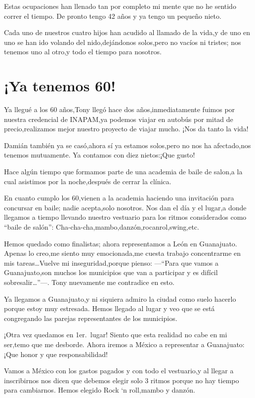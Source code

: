 \documentclass[letterpaper,12pt]{book}
\begin{document}
Estas ocupaciones han llenado tan por completo mi mente que no he sentido correr el tiempo. De pronto tengo 42 años y ya tengo un pequeño nieto.

Cada uno de nuestros cuatro hijos han acudido al llamado de la vida,y de uno en uno se han ido volando del nido,dejándonos solos,pero no vacíos ni tristes; nos tenemos uno al otro,y todo el tiempo para nosotros.

\chapter{¡Ya tenemos 60!}
Ya llegué a los 60 años,Tony llegó hace dos años,inmediatamente fuimos por nuestra credencial de INAPAM,ya podemos viajar en autobús por mitad de precio,realizamos mejor nuestro proyecto de viajar mucho. ¡Nos da tanto la vida!

Damián también ya se casó,ahora sí ya estamos solos,pero no nos ha afectado,nos tenemos mutuamente. Ya contamos con diez nietos:¡Que gusto!  

Hace algún tiempo que formamos parte de una academia de baile de salon,a la cual asistimos por la noche,después de cerrar la clínica.

En cuanto cumplo los 60,vienen a la academia haciendo una invitación para concursar en baile; nadie acepta,solo nosotros. Nos dan el día y el lugar,a donde llegamos a tiempo llevando nuestro vestuario para los ritmos considerados como ``baile de salón'': Cha-cha-cha,mambo,danzón,rocanrol,swing,etc.

Hemos quedado como finalistas; ahora representamos a León en Guanajuato.  Apenas lo creo,me siento muy emocionada,me cuesta trabajo concentrarme en mis tareas\ldots Vuelve mi inseguridad,porque pienso: ---``Para que vamos a Guanajuato,son muchos los municipios que van a participar y es difícil sobresalir\ldots''---. Tony nuevamente me contradice en esto. 

Ya llegamos a Guanajuato,y ni siquiera admiro la ciudad como suelo hacerlo porque estoy muy estresada. Hemos llegado al lugar y veo que se está congregando las parejas representantes de los municipios.

¡Otra vez quedamos en 1er.\ lugar! Siento que esta realidad no cabe en mi ser,temo que me desborde. Ahora iremos a México a representar a Guanajuato: ¡Que honor y que responsabilidad!

Vamos a México con los gastos pagados y con todo el vestuario,y al llegar a inscribirnos nos dicen que debemos elegir solo 3 ritmos porque no hay tiempo para cambiarnos. Hemos elegido Rock `n roll,mambo y danzón.
\end{document}
